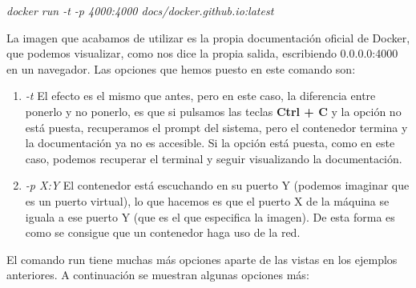 \documentclass[]{article}
\begin{document}
\begin{center}

	\it docker run -t -p 4000:4000 docs/docker.github.io:latest

\end{center}
La imagen que acabamos de utilizar es la propia documentación oficial de Docker, que podemos visualizar, como nos dice la propia salida, escribiendo 0.0.0.0:4000 en un navegador.
Las opciones que hemos puesto en este comando son:
\begin{enumerate}
\renewcommand{\labelenumi}{$ \bullet $}
	
\item {\it -t}
 El efecto es el mismo que antes, pero en este caso, la diferencia entre ponerlo y no ponerlo, es que si pulsamos las teclas {\bf Ctrl + C} y la opción no está puesta, recuperamos el prompt del sistema, pero el contenedor termina y la documentación ya no es accesible. Si la opción está puesta, como en este caso, podemos recuperar el terminal y seguir visualizando la documentación.

\item {\it -p X:Y} 
El contenedor está escuchando en su puerto Y (podemos imaginar que es un puerto virtual), lo que hacemos es que el puerto X de la máquina se iguala a ese puerto Y (que es el que especifica la imagen). De esta forma es como se consigue que un contenedor haga uso de la red.

\end{enumerate}

El comando run tiene muchas más opciones aparte de las vistas en los ejemplos anteriores.
A continuación se muestran algunas opciones más:
\end{document}
